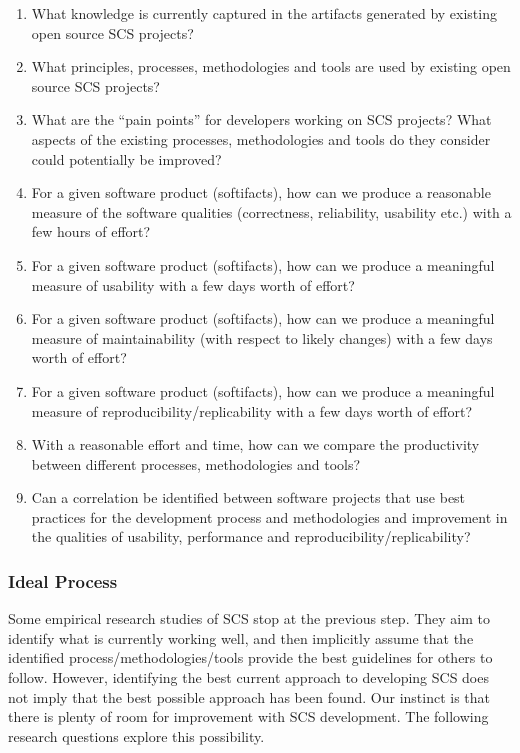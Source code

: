 \documentclass[12pt]{article}
\begin{document}
\begin{enumerate}
\item What knowledge is currently captured in the artifacts generated by
  existing open source SCS projects?
\item What principles, processes, methodologies and tools are used by existing
  open source SCS projects?
\item What are the ``pain points'' for developers working on SCS projects?  What
  aspects of the existing processes, methodologies and tools do they consider
  could potentially be improved?
\item For a given software product (softifacts), how can we produce a
  reasonable measure of the software qualities (correctness, reliability,
  usability etc.) with a few hours of effort?
\item For a given software product (softifacts), how can we produce a
  meaningful measure of usability with a few days worth of effort?
\item For a given software product (softifacts), how can we produce a
  meaningful measure of maintainability (with respect to likely changes) with a
  few days worth of effort?
\item For a given software product (softifacts), how can we produce a
  meaningful measure of reproducibility/replicability with a few days worth of
  effort?
\item With a reasonable effort and time, how can we compare the productivity
  between different processes, methodologies and tools?
\item Can a correlation be identified between software projects that use best 
  practices for the development process and methodologies and improvement in the
  qualities of usability, performance and reproducibility/replicability?
\end{enumerate}

\subsubsection*{Ideal Process}

Some empirical research studies of SCS stop at the previous step.  They aim to
identify what is currently working well, and then implicitly assume that the
identified process/methodologies/tools provide the best guidelines for others to
follow.  However, identifying the best current approach to developing SCS does
not imply that the best possible approach has been found.  Our instinct is that
there is plenty of room for improvement with SCS development.  The following
research questions explore this possibility.
\end{document}
